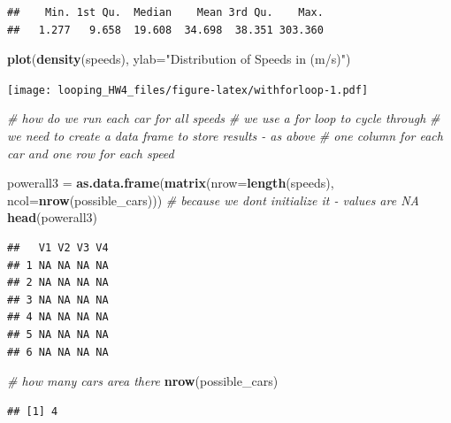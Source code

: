 \documentclass[
]{article}
\newenvironment{Shaded}{\begin{snugshade}}{\end{snugshade}}
\newcommand{\AttributeTok}[1]{\textcolor[rgb]{0.13,0.29,0.53}{#1}}
\newcommand{\CommentTok}[1]{\textcolor[rgb]{0.56,0.35,0.01}{\textit{#1}}}
\newcommand{\FunctionTok}[1]{\textcolor[rgb]{0.13,0.29,0.53}{\textbf{#1}}}
\newcommand{\NormalTok}[1]{#1}
\newcommand{\OtherTok}[1]{\textcolor[rgb]{0.56,0.35,0.01}{#1}}
\newcommand{\StringTok}[1]{\textcolor[rgb]{0.31,0.60,0.02}{#1}}
\begin{document}
\begin{verbatim}
##    Min. 1st Qu.  Median    Mean 3rd Qu.    Max. 
##   1.277   9.658  19.608  34.698  38.351 303.360
\end{verbatim}

\begin{Shaded}
\begin{Highlighting}[]
\FunctionTok{plot}\NormalTok{(}\FunctionTok{density}\NormalTok{(speeds), }\AttributeTok{ylab=}\StringTok{"Distribution of Speeds in (m/s)"}\NormalTok{)}
\end{Highlighting}
\end{Shaded}

\texttt{[image: looping\_HW4\_files/figure-latex/withforloop-1.pdf]}

\begin{Shaded}
\begin{Highlighting}[]
\CommentTok{\# how do we run each car for all speeds }
\CommentTok{\# we use a for loop to cycle through}
\CommentTok{\# we need to create a data frame to store results {-} as above}
\CommentTok{\# one column for each car and one row for each speed}

\NormalTok{powerall3 }\OtherTok{=} \FunctionTok{as.data.frame}\NormalTok{(}\FunctionTok{matrix}\NormalTok{(}\AttributeTok{nrow=}\FunctionTok{length}\NormalTok{(speeds), }\AttributeTok{ncol=}\FunctionTok{nrow}\NormalTok{(possible\_cars)))}
\CommentTok{\# because we don\textquotesingle{}t initialize it {-} values are NA}
\FunctionTok{head}\NormalTok{(powerall3)}
\end{Highlighting}
\end{Shaded}

\begin{verbatim}
##   V1 V2 V3 V4
## 1 NA NA NA NA
## 2 NA NA NA NA
## 3 NA NA NA NA
## 4 NA NA NA NA
## 5 NA NA NA NA
## 6 NA NA NA NA
\end{verbatim}

\begin{Shaded}
\begin{Highlighting}[]
\CommentTok{\# how many cars area there}
\FunctionTok{nrow}\NormalTok{(possible\_cars)}
\end{Highlighting}
\end{Shaded}

\begin{verbatim}
## [1] 4
\end{verbatim}
\end{document}
